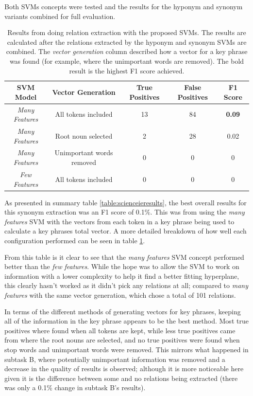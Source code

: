 Both SVMs concepts were tested and the results for the hyponym and synonym variants combined for full evaluation.

\begin{table}
	\centering
	\begin{tabular}{c | c | c | c | c }
		\textbf{SVM Model} & \textbf{Vector Generation} & \textbf{True Positives} & \textbf{False Positives} & \textbf{F1 Score} \\
		\hline
		\textit{Many Features} & All tokens included & 13 & 84 & \textbf{0.09} \\
		\textit{Many Features} & Root noun selected & 2 & 28 & 0.02 \\
		\textit{Many Features} & Unimportant words removed & 0 & 0 & 0 \\
		\textit{Few Features} & All tokens included & 0 & 0 & 0 \\
	\end{tabular}
	\caption[Relation Extraction Specific Results]{Results from doing relation extraction with the proposed SVMs. The results are calculated after the relations extracted by the hyponym and synonym SVMs are combined. The \textit{vector generation} column described how a vector for a key phrase was found (for example, where the unimportant words are removed). The bold result is the highest F1 score achieved.}
	\label{table:relresults}
\end{table}

As presented in summary table \ref{table:scienceieresults}, the best overall results for this synonym extraction was an F1 score of 0.1\%. This was from using the \textit{many features} SVM with the vectors from each token in a key phrase being used to calculate a key phrases total vector. A more detailed breakdown of how well each configuration performed can be seen in table \ref{table:relresults}. 

From this table is it clear to see that the \textit{many features} SVM concept performed better than the \textit{few features}. While the hope was to allow the SVM to work on information with a lower complexity to help it find a better fitting hyperplane, this clearly hasn't worked as it didn't pick any relations at all; compared to \textit{many features} with the same vector generation, which chose a total of 101 relations. 

In terms of the different methods of generating vectors for key phrases, keeping all of the information in the key phrase appears to be the best method. Most true positives where found when all tokens are kept, while less true positives came from where the root nouns are selected, and no true positives were found when stop words and unimportant words were removed. This mirrors what happened in subtask B, where potentially unimportant information was removed and a decrease in the quality of results is observed; although it is more noticeable here given it is the difference between some and no relations being extracted (there was only a 0.1\% change in subtask B's results).

